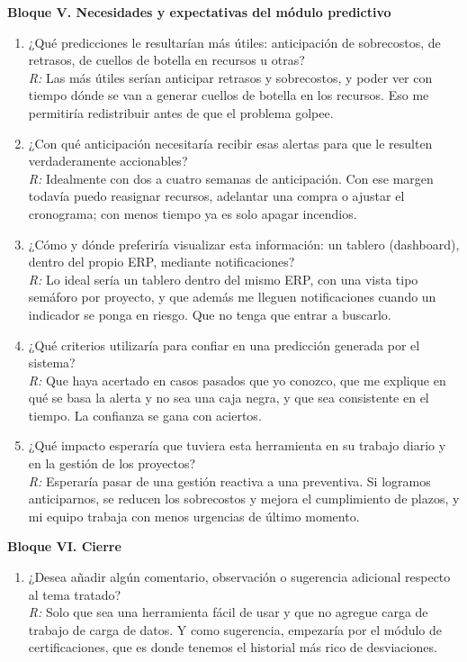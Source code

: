 \documentclass{univalle-perfil}
\begin{document}
\noindent\textbf{Bloque V. Necesidades y expectativas del módulo predictivo}
\begin{enumerate}\setlength{\itemsep}{6pt}\setlength{\parskip}{0pt}
  \item ¿Qué predicciones le resultarían más útiles: anticipación de sobrecostos, de retrasos, de cuellos de botella en recursos u otras?\\
  \textit{R:} Las más útiles serían anticipar retrasos y sobrecostos, y poder ver con tiempo dónde se van a generar cuellos de botella en los recursos. Eso me permitiría redistribuir antes de que el problema golpee.

  \item ¿Con qué anticipación necesitaría recibir esas alertas para que le resulten verdaderamente accionables?\\
  \textit{R:} Idealmente con dos a cuatro semanas de anticipación. Con ese margen todavía puedo reasignar recursos, adelantar una compra o ajustar el cronograma; con menos tiempo ya es solo apagar incendios.

  \item ¿Cómo y dónde preferiría visualizar esta información: un tablero (dashboard), dentro del propio ERP, mediante notificaciones?\\
  \textit{R:} Lo ideal sería un tablero dentro del mismo ERP, con una vista tipo semáforo por proyecto, y que además me lleguen notificaciones cuando un indicador se ponga en riesgo. Que no tenga que entrar a buscarlo.

  \item ¿Qué criterios utilizaría para confiar en una predicción generada por el sistema?\\
  \textit{R:} Que haya acertado en casos pasados que yo conozco, que me explique en qué se basa la alerta y no sea una caja negra, y que sea consistente en el tiempo. La confianza se gana con aciertos.

  \item ¿Qué impacto esperaría que tuviera esta herramienta en su trabajo diario y en la gestión de los proyectos?\\
  \textit{R:} Esperaría pasar de una gestión reactiva a una preventiva. Si logramos anticiparnos, se reducen los sobrecostos y mejora el cumplimiento de plazos, y mi equipo trabaja con menos urgencias de último momento.
\end{enumerate}

\noindent\textbf{Bloque VI. Cierre}
\begin{enumerate}\setlength{\itemsep}{6pt}\setlength{\parskip}{0pt}
  \item ¿Desea añadir algún comentario, observación o sugerencia adicional respecto al tema tratado?\\
  \textit{R:} Solo que sea una herramienta fácil de usar y que no agregue carga de trabajo de carga de datos. Y como sugerencia, empezaría por el módulo de certificaciones, que es donde tenemos el historial más rico de desviaciones.
\end{enumerate}
\end{document}
